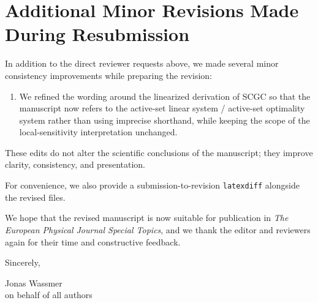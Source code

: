 \documentclass[11pt]{article}
\begin{document}
\section*{Additional Minor Revisions Made During Resubmission}

In addition to the direct reviewer requests above, we made several minor consistency improvements while preparing the revision:

\begin{enumerate}
\item We refined the wording around the linearized derivation of SCGC so that the manuscript now refers to the active-set linear system / active-set optimality system rather than using imprecise shorthand, while keeping the scope of the local-sensitivity interpretation unchanged.
\end{enumerate}

These edits do not alter the scientific conclusions of the manuscript; they improve clarity, consistency, and presentation.

For convenience, we also provide a submission-to-revision \texttt{latexdiff} alongside the revised files.

We hope that the revised manuscript is now suitable for publication in \textit{The European Physical Journal Special Topics}, and we thank the editor and reviewers again for their time and constructive feedback.

\vspace{1em}

\noindent Sincerely,

\vspace{2em}

\noindent Jonas Wassmer\\
on behalf of all authors
\end{document}
